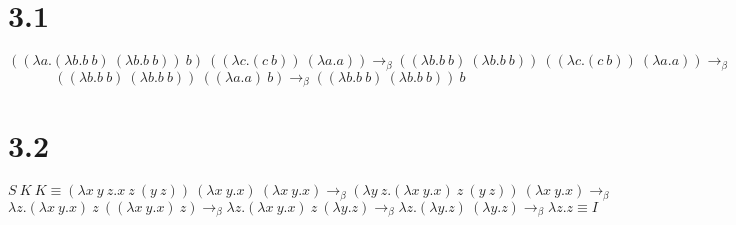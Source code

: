 \documentclass[12pt]{article}
\begin{document}
\section*{3.1}

$$((\lambda a.(\lambda b.b\ b)\ (\lambda b.b\ b))\ b)\ ((\lambda c.(c\ b))\ (\lambda a.a)) \rightarrow_\beta
((\lambda b.b\ b)\ (\lambda b.b\ b))\ ((\lambda c.(c\ b))\ (\lambda a.a)) \rightarrow_\beta$$
$$((\lambda b.b\ b)\ (\lambda b.b\ b))\ ((\lambda a.a)\ b) \rightarrow_\beta
((\lambda b.b\ b)\ (\lambda b.b\ b))\ b$$

\section*{3.2}

$$S\ K\ K \equiv (\lambda x\ y\ z.x\ z\ (y\ z))\ (\lambda x\ y.x)\ (\lambda x\ y.x) \rightarrow_\beta
(\lambda y\ z.(\lambda x\ y.x)\ z\ (y\ z))\ (\lambda x\ y.x) \rightarrow_\beta$$
$$\lambda z.(\lambda x\ y.x)\ z\ ((\lambda x\ y.x)\ z) \rightarrow_\beta 
\lambda z.(\lambda x\ y.x)\ z\ (\lambda y.z) \rightarrow_\beta
\lambda z.(\lambda y.z)\ (\lambda y.z) \rightarrow_\beta
\lambda z.z \equiv I$$
\end{document}

